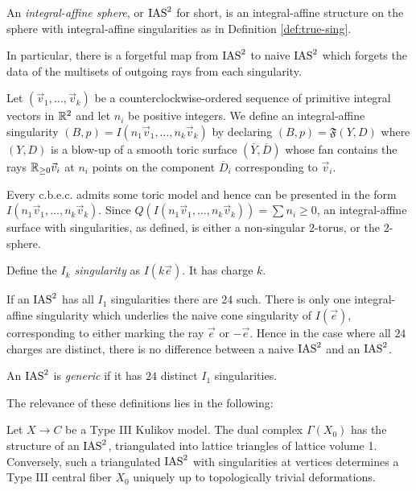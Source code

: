 \documentclass[table,x11names]{amsart}
\begin{document}
 \begin{definition} An {\it integral-affine sphere}, or $\operatorname{IAS}^2$ for short,
 is an integral-affine structure
 on the sphere with integral-affine singularities as in Definition \ref{def:true-sing}. \end{definition}
 
In particular, there is a forgetful map from $\operatorname{IAS}^2$ to naive $\operatorname{IAS}^2$
which forgets the data of the multisets of outgoing rays from each singularity.

\begin{definition} Let $(\vec{v}_1,\dots,\vec{v}_k)$ be a counterclockwise-ordered
sequence of primitive integral vectors in $\mathbb{R}^2$
and let $n_i$ be positive integers. We define an integral-affine singularity
$(B,p) = I(n_1\vec{v}_1,\dots,n_k\vec{v}_k)$ by declaring
$(B,p)=\mathfrak{F}(Y,D)$ where $(Y,D)$ is a blow-up of
a smooth toric surface $(\overline{Y},\overline{D})$ whose fan contains the rays
$\mathbb{R}_{\geq 0} \vec{v}_i$ at $n_i$ points
on the component $\overline{D}_i$ corresponding to $\vec{v}_i$.
\end{definition} 

Every c.b.e.c. admits some toric model and hence can be
presented in the form $I(n_1\vec{v}_1,\dots,n_k\vec{v}_k)$.
Since $Q(I(n_1\vec{v}_1,\dots,n_k\vec{v}_k)) = \sum n_i \geq 0$,
 an integral-affine surface with singularities, as defined,
is either a non-singular $2$-torus, or the $2$-sphere.

\begin{definition} Define the {\it$I_k$ singularity} as $I(k\vec{e})$. It has charge $k$. \end{definition}

\begin{remark}\label{rem:i1s} If an $\operatorname{IAS}^2$ has all $I_1$ singularities
there are $24$ such. There is only one integral-affine singularity which underlies the naive cone
singularity of $I(\vec{e})$, corresponding to either marking the ray $\vec{e}$ or $-\vec{e}$.
Hence in the case where all $24$ charges are distinct,
there is no difference between
a naive $\operatorname{IAS}^2$ and an $\operatorname{IAS}^2$. \end{remark}


\begin{definition}
  An $\operatorname{IAS}^2$ is {\it generic} if it has $24$ distinct $I_1$
  singularities.
\end{definition}

The relevance of these definitions lies in the following:

\begin{theorem}\label{thm:ias-to-kulikov} Let $X\rightarrow C$ be a Type III Kulikov model.
The dual complex $\Gamma(X_0)$ has
the structure of an $\operatorname{IAS}^2$, triangulated into lattice triangles
of lattice volume 1.
Conversely, such a triangulated $\operatorname{IAS}^2$ with singularities
at vertices determines a 
Type III central fiber $X_0$ uniquely up to
topologically trivial deformations.
\end{theorem}
\end{document}
